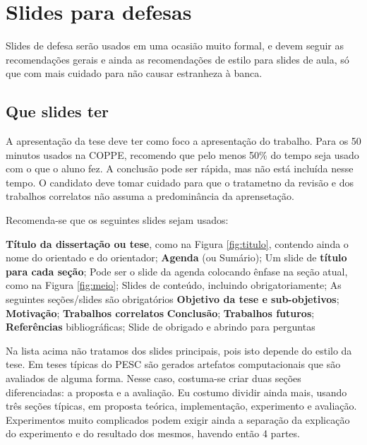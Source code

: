 \section{Slides para defesas}

Slides de defesa serão usados em uma ocasião muito formal, e devem seguir as recomendações gerais e ainda as recomendações de estilo para slides de aula, só que com mais cuidado para não causar estranheza à banca.

\subsection{Que slides ter}

A apresentação da tese deve ter como foco a apresentação do trabalho. Para os 50 minutos usados na COPPE, recomendo que pelo menos 50\% do tempo seja usado com o que o aluno fez. A conclusão pode ser rápida, mas não está incluída nesse tempo. O candidato deve tomar cuidado para que o tratametno da revisão e dos trabalhos correlatos não assuma a predominância da aprensetação.

Recomenda-se que os seguintes slides sejam usados:
\begin{outline}
    \1 \textbf{Título da dissertação ou tese}, como na Figura \ref{fig:titulo}, contendo ainda o nome do orientado e do orientador;
    \1 \textbf{Agenda} (ou Sumário);
    \1 Um slide de \textbf{título para cada seção};
    \2 Pode ser o slide da agenda colocando ênfase na seção atual, como na Figura \ref{fig:meio};
    \2 Slides de conteúdo, incluindo obrigatoriamente;
    \2 As seguintes seções/slides são obrigatórios
        \3 \textbf{Objetivo da tese e sub-objetivos};
        \3 \textbf{Motivação};
        \3 \textbf{Trabalhos correlatos}
        \3 \textbf{Conclusão};
        \3 \textbf{Trabalhos futuros};
    \1 \textbf{Referências} bibliográficas;
    \1 Slide de obrigado e abrindo para perguntas
\end{outline}

Na lista acima não tratamos dos slides principais, pois isto depende do estilo da tese. Em teses típicas do PESC são gerados artefatos computacionais que são avaliados de alguma forma. Nesse caso, costuma-se criar duas seções diferenciadas: a proposta e a avaliação. Eu costumo dividir ainda mais, usando três seções típicas, em proposta teórica, implementação, experimento e avaliação. Experimentos muito complicados podem exigir ainda a separação da explicação do experimento e do resultado dos mesmos, havendo então 4 partes.

